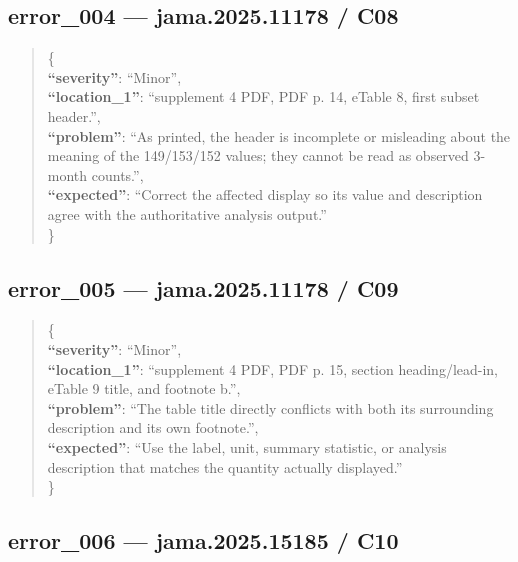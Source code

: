 \documentclass[
  letterpaper,
  9pt]{extreport}
\begin{document}
\hypertarget{error_004--jama202511178--c08}{%
\subsection{error\_004 --- jama.2025.11178 /
C08}\label{error_004--jama202511178--c08}}

\begin{quote}
\{\\
\textbf{``severity''}: ``Minor'',\\
\textbf{``location\_1''}: ``supplement 4 PDF, PDF p. 14, eTable 8, first
subset header.'',\\
\textbf{``problem''}: ``As printed, the header is incomplete or
misleading about the meaning of the 149/153/152 values; they cannot be
read as observed 3-month counts.'',\\
\textbf{``expected''}: ``Correct the affected display so its value and
description agree with the authoritative analysis output.''\\
\}
\end{quote}

\hypertarget{error_005--jama202511178--c09}{%
\subsection{error\_005 --- jama.2025.11178 /
C09}\label{error_005--jama202511178--c09}}

\begin{quote}
\{\\
\textbf{``severity''}: ``Minor'',\\
\textbf{``location\_1''}: ``supplement 4 PDF, PDF p. 15, section
heading/lead-in, eTable 9 title, and footnote b.'',\\
\textbf{``problem''}: ``The table title directly conflicts with both its
surrounding description and its own footnote.'',\\
\textbf{``expected''}: ``Use the label, unit, summary statistic, or
analysis description that matches the quantity actually displayed.''\\
\}
\end{quote}

\hypertarget{error_006--jama202515185--c10}{%
\subsection{error\_006 --- jama.2025.15185 /
C10}\label{error_006--jama202515185--c10}}
\end{document}
